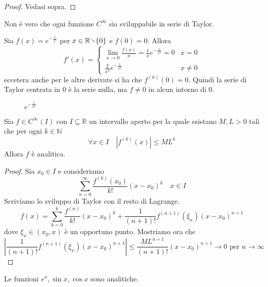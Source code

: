 \begin{proof}
    Vedasi sopra.
\end{proof}
Non è vero che ogni funzione \(C^{\infty}\) sia sviluppabile in serie di Taylor.
\begin{example}
    Sia \(f(x) = e^{-\frac{1}{x^2}}\) per \(x \in \mathbb{R} \sminus \{0\} \) e \(f(0)
    = 0\). Allora 
    \[
        f'(x) = \begin{cases}
            \lim_{x \to 0} \frac{f(x)}{x} = \frac{1}{x} e^{-\frac{1}{x^2}} = 0  & x = 0 \\
            \frac{2}{x^3} e^{-\frac{1}{x^2}} & x \neq 0
        \end{cases}
    \]
    eccetera anche per le altre derivate si ha che \(f^{(k)}(0) = 0\). Quindi la
    serie di Taylor centrata in \(0\) è la serie nulla, ma \(f \neq 0\) in alcun
    intorno di \(0\).
    \begin{figure}[ht]
        \centering
        \caption{\(\displaystyle e^{-\frac{1}{x^2}}\)}
    \end{figure}
\end{example}
\begin{theorem}
    Sia \(f \in C^{\infty}(I)\) con \(I \subseteq \mathbb{R} \) un intervallo
    aperto per la quale esistano \(M, L > 0\) tali che per ogni \(k \in \mathbb{N}\) 
    \[
        \forall  x \in I \quad |f^{(k)}(x)| \le M L^{k}
    \]
    Allora \(f\) è analitica.
\end{theorem}
\begin{proof}
    Sia \(x_{0} \in I\) e consideriamo
    \[
        \sum_{n=0}^{\infty} \frac{f^{(k)} (x_{0})}{k!} {(x - x_{0})}^{k} \quad x
        \in I
    \]
    Scriviamo lo sviluppo di Taylor con il resto di Lagrange.
    \[
        f(x) = \sum_{k=0}^{k} \frac{f^{(n)}}{k!}  
        {(x - x_{0})}^{k} + \frac{1}{(n+1)!} f^{(n+1)}(\xi_x) {(x - x_{0})}^{n+1}
    \]
    dove \(\xi_x \in (x_{0}, x)\) è un opportuno punto.
    Mostriamo ora che  
    \[
        \left| \frac{1}{(n+1)!} f^{(n+1)}(\xi_x) {(x - x_{0})}^{n+1} \right| \le
    \frac{M L^{n+1}}{(n+1)!} {(x - x_{0})}^{n+1} \to 0 \text{ per } n \to
    \infty
    \]
\end{proof}
\begin{example}
    Le funzioni \(e^{x}, \sin x, \cos x\) sono analitiche.
\end{example}

